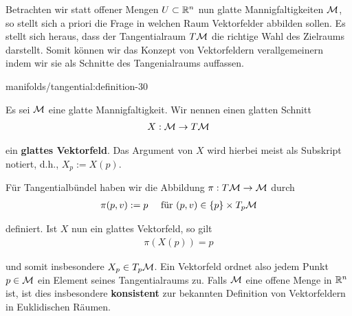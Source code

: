 \par
Betrachten wir statt offener Mengen \(U\subset\mathbb{R}^n\) nun glatte Mannigfaltigkeiten \(\mathcal{M}\), so stellt sich a priori die Frage in welchen Raum Vektorfelder abbilden sollen.
Es stellt sich heraus, dass der Tangentialraum \(T\mathcal{M}\) die richtige Wahl des Zielraums darstellt.
Somit können wir das Konzept von Vektorfeldern verallgemeinern indem wir sie als Schnitte des Tangenialraums auffassen.
\begin{definition}{}{manifolds/tangential:definition-30}



\par
Es sei \(\mathcal{M}\) eine glatte Mannigfaltigkeit.
Wir nennen einen glatten Schnitt
\begin{align*}
X:\mathcal{M}\to T\mathcal{M}
\end{align*}
\par
ein \textbf{glattes Vektorfeld}.
Das Argument von \(X\) wird hierbei meist als Subskript notiert, d.h., \(X_p := X(p)\).
\end{definition}

\par
Für Tangentialbündel haben wir die Abbildung \(\pi:T\mathcal{M}\to\mathcal{M}\) durch
\begin{align*}
\pi(p,v):= p\quad\text{ für } (p,v)\in\{p\}\times T_p\mathcal{M}
\end{align*}
\par
definiert.
Ist \(X\) nun ein glattes Vektorfeld, so gilt
\begin{align*}
\pi(X(p)) = p
\end{align*}
\par
und somit insbesondere \(X_p\in T_p\mathcal{M}\).
Ein Vektorfeld ordnet also jedem Punkt \(p\in\mathcal{M}\) ein Element seines Tangentialraums zu.
Falls \(\mathcal{M}\) eine offene Menge in \(\mathbb{R}^n\) ist, ist dies insbesondere \textbf{konsistent} zur bekannten Definition von Vektorfeldern in Euklidischen Räumen.


